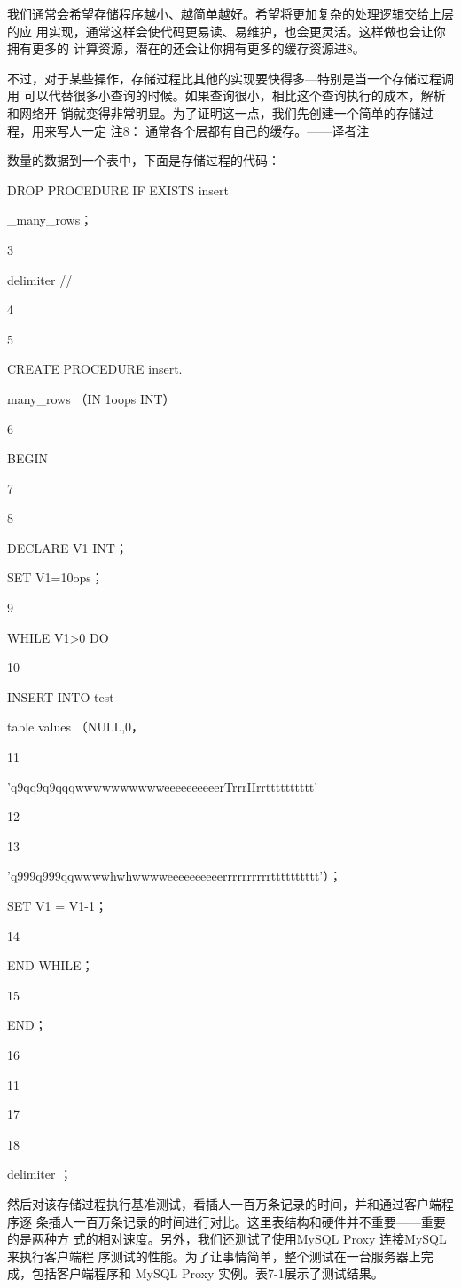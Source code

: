 我们通常会希望存储程序越小、越简单越好。希望将更加复杂的处理逻辑交给上层的应
用实现，通常这样会使代码更易读、易维护，也会更灵活。这样做也会让你拥有更多的
计算资源，潜在的还会让你拥有更多的缓存资源进8。

不过，对于某些操作，存储过程比其他的实现要快得多—特别是当一个存储过程调用
可以代替很多小查询的时候。如果查询很小，相比这个查询执行的成本，解析和网络开
销就变得非常明显。为了证明这一点，我们先创建一个简单的存储过程，用来写人一定
注8： 通常各个层都有自己的缓存。——译者注

数量的数据到一个表中，下面是存储过程的代码：

DROP PROCEDURE IF EXISTS insert

\_many\_rows；

3

delimiter //

4

5

CREATE PROCEDURE insert.

many\_rows （IN 1oops INT）

6

BEGIN

7

8

DECLARE V1 INT；

SET V1=10ops；

9

WHILE V1>0 DO

10

INSERT INTO test

table values （NULL,0，

11

'q9qq9q9qqqwwwwwwwwwweeeeeeeeeerTrrrIIrrtttttttttt'

12

13

'q999q999qqwwwwhwhwwwweeeeeeeeeerrrrrrrrrrtttttttttt'）；

SET V1 = V1-1；

14

END WHILE；

15

END；

16

11

17

18

delimiter ；

然后对该存储过程执行基准测试，看插人一百万条记录的时间，并和通过客户端程序逐
条插人一百万条记录的时间进行对比。这里表结构和硬件并不重要——重要的是两种方
式的相对速度。另外，我们还测试了使用MySQL Proxy 连接MySQL 来执行客户端程
序测试的性能。为了让事情简单，整个测试在一台服务器上完成，包括客户端程序和
MySQL Proxy 实例。表7-1展示了测试结果。

